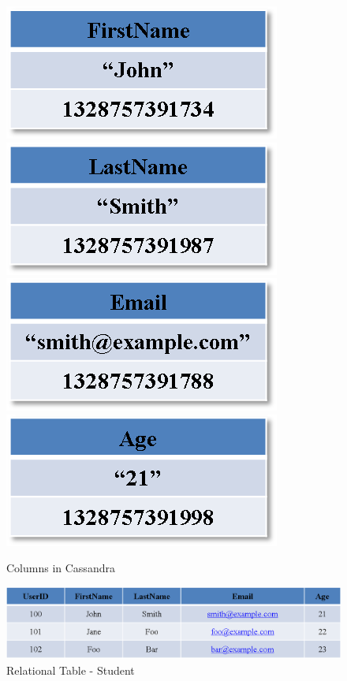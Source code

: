 \begin{description}
\begin{figure}[H]
	\newcommand{\W}{.4\textwidth}
	\centering
	\includegraphics[width=\W]{./figure/Example/Column_FirstName.png}
	\includegraphics[width=\W]{./figure/Example/Column_LastName.png}
	\includegraphics[width=\W]{./figure/Example/Column_Email.png}
	\includegraphics[width=\W]{./figure/Example/Column_Age.png}
	\caption{Columns in Cassandra}\label{f:column-FirstName}
\end{figure}

\begin{figure}[h]
	\centering
	\includegraphics[width=.8\textwidth]{./figure/Example/RelationalTable_User.png}
	\caption{Relational Table - Student}\label{f:RDB-User}
\end{figure}


\end{description}
